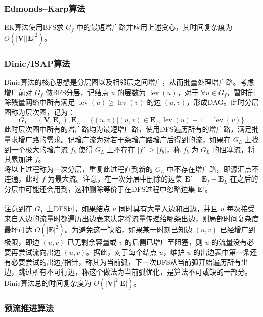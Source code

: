 \documentclass[12pt,a4paper]{article}
\begin{document}
\subsubsection{Edmonds–Karp算法}
EK算法使用BFS求 $G_f$ 中的最短增广路并应用上述贪心，其时间复杂度为 $O(|\mathbf{V}||\mathbf{E}|^2)$。\\
\subsubsection{Dinic/ISAP算法}
Dinic算法的核心思想是分层图以及相邻层之间增广，从而批量处理增广路。考虑增广前对 $G_f$ 做BFS分层，记结点 $u$ 的层数为 $\operatorname{lev}(u)$，对于 $\forall u\in G_f$，暂时删除残量网络中所有满足 $\operatorname{lev}(u)\ge\operatorname{lev}(v)$ 的边 $(u,v)$，形成DAG。此时分层图称为层次图，记为：
\begin{equation*}
	G_L=(\mathbf{V},\mathbf{E}_L),\mathbf{E}_L=\{(u,v)|(u,v)\in\mathbf{E}_f,\operatorname{lev}(u)+1=\operatorname{lev}(v)\}
\end{equation*}
此时层次图中所有的增广路均为最短增广路，使用DFS遍历所有的增广路，满足批量求增广路的需求。记增广流为对若干条增广路增广后得到的流，如果在 $G_L$ 上找到一个极大的增广流 $f_b$ 使得 $G_L$ 上不存在 $|f'|\ge|f_b|$，称 $f_b$ 为 $G_L$ 的阻塞流，将其累加进 $f$。\\
将以上过程称为一次分层，重复此过程直到新的 $G_L$ 中不存在增广路，即源汇点不连通，此时 $f$ 为最大流。注意，在一次分层中删除的边集 $\mathbf{E}'=\mathbf{E}_f-\mathbf{E}_L$ 在之后的分层中可能还会用到，这种删除等价于在DFS过程中忽略边集 $\mathbf{E}'$。\\
\\
注意到在 $G_L$ 上DFS时，如果结点 $u$ 同时具有大量入边和出边，并且 $u$ 每次接受来自入边的流量时都遍历出边表来决定将流量传递给哪条出边，则局部时间复杂度最坏可达 $O(|\mathbf{E}|^2)$。为避免这一缺陷，如果某一时刻已知边 $(u, v)$ 已经增广到极限，即边 $(u, v)$ 已无剩余容量或 $v$ 的后侧已增广至阻塞，则 $u$ 的流量没有必要再尝试流向出边 $(u, v)$。据此，对于每个结点 $u$，维护 $u$ 的出边表中第一条还有必要尝试的出边/指针，称其为当前弧，下一次DFS从当前弧开始遍历所有出边，跳过所有不可行边，称这个做法为当前弧优化，是算法不可或缺的一部分。Dinic算法总的时间复杂度为 $O(|\mathbf{V}|^2|\mathbf{E}|)$。

\subsubsection{预流推进算法}
\end{document}
